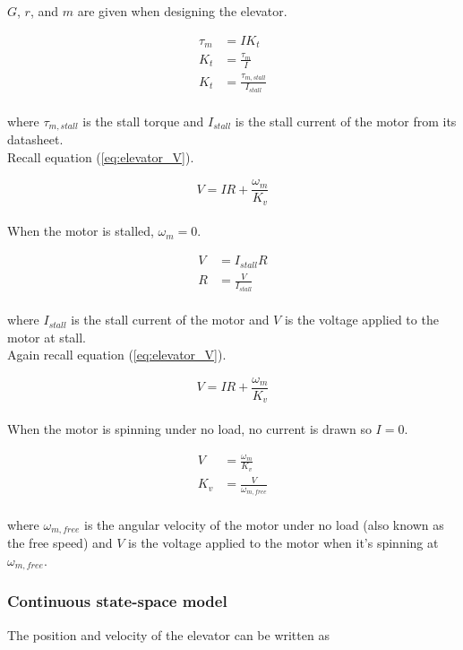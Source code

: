 $G$, $r$, and $m$ are given when designing the elevator.

\begin{align}
  \tau_m &= I K_t \nonumber \\
  K_t &= \frac{\tau_m}{I} \nonumber \\
  K_t &= \frac{\tau_{m,stall}}{I_{stall}}
\end{align}
\\
where $\tau_{m,stall}$ is the stall torque and $I_{stall}$ is the stall current
of the motor from its datasheet. \\

Recall equation (\ref{eq:elevator_V}).

\begin{equation*}
  V = IR + \frac{\omega_m}{K_v}
\end{equation*}
\\
When the motor is stalled, $\omega_m = 0$.

\begin{align}
  V &= I_{stall} R \nonumber \\
  R &= \frac{V}{I_{stall}}
\end{align}
\\
where $I_{stall}$ is the stall current of the motor and $V$ is the voltage
applied to the motor at stall. \\

Again recall equation (\ref{eq:elevator_V}).

\begin{equation*}
  V = IR + \frac{\omega_m}{K_v}
\end{equation*}
\\
When the motor is spinning under no load, no current is drawn so $I = 0$.

\begin{align}
  V &= \frac{\omega_m}{K_v} \nonumber \\
  K_v &= \frac{V}{\omega_{m,free}}
\end{align}
\\
where $\omega_{m,free}$ is the angular velocity of the motor under no load (also
known as the free speed) and $V$ is the voltage applied to the motor when
it's spinning at $\omega_{m,free}$.

\subsubsection{Continuous state-space model}

The position and velocity of the elevator can be written as

